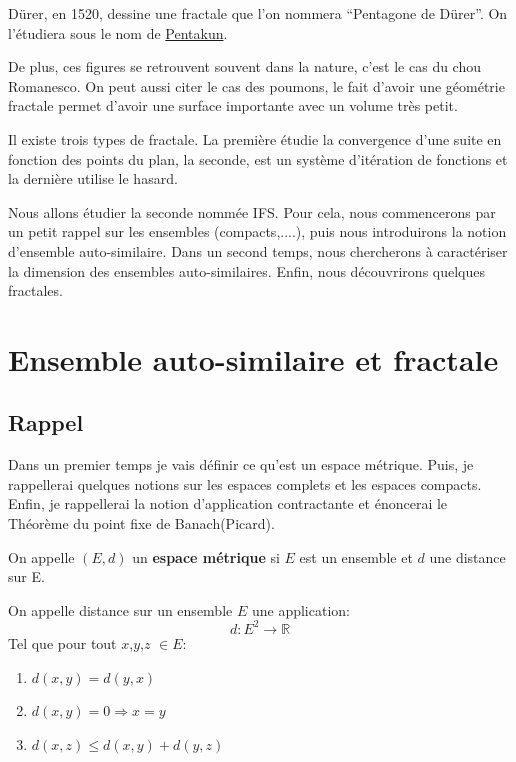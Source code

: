 \documentclass[a4paper, 12pt]{report}
\begin{document}
		\hspace{.7 cm} Dürer, en 1520, dessine une fractale que l'on nommera ``Pentagone de Dürer''. On l'étudiera sous le nom de \hyperref[Pentakun]{Pentakun}. 
		
		
		\hspace{.7 cm} De plus,  ces figures se retrouvent souvent dans la nature,  c'est le cas du chou Romanesco. On peut aussi citer le cas des poumons, le fait d'avoir une géométrie fractale permet d'avoir une surface importante avec un volume très petit.
		
		\hspace{.7 cm} Il existe trois types de fractale. La première étudie la convergence d'une suite en fonction des points du plan, la seconde, est un système d'itération de fonctions et la dernière utilise le hasard.
		
		\hspace{.7 cm}Nous allons étudier la seconde nommée IFS. Pour cela, nous commencerons par un petit rappel sur les ensembles (compacts,....), puis nous introduirons la notion d'ensemble auto-similaire. Dans un second temps, nous chercherons à caractériser la dimension des ensembles auto-similaires. Enfin, nous découvrirons quelques fractales.	
	
	\chapter{\bf Ensemble auto-similaire et fractale}
		\section{Rappel}
			Dans un premier temps je vais définir ce qu'est un espace métrique. Puis, je rappellerai quelques notions sur les espaces complets et les espaces compacts. Enfin, je rappellerai la notion d'application contractante et énoncerai le Théorème du point fixe de Banach(Picard).
			
			\begin{definition}
				On appelle $(E,d)$ un \textbf{espace métrique} si $E$ est un ensemble et $d$ une distance sur E.
				
				On appelle distance sur un ensemble $E$ une application:
				\begin{equation*}
					d:E^2\longrightarrow \mathds{R}
				\end{equation*}
			Tel que pour tout $x$,$y$,$z$ $\in E$:
				\begin{enumerate}\itemsep2pt
					\item $d(x,y)=d(y,x)$
					\item $d(x,y)=0 \Longrightarrow x=y$
					\item $d(x,z) \leq d(x,y)+d(y,z)$
				\end{enumerate}
			\end{definition}
			
\end{document}
